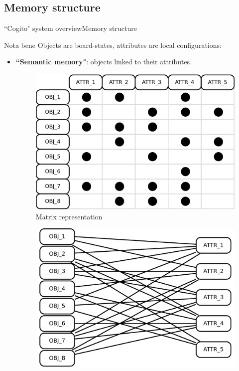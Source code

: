 \subsection{Memory structure}
\begin{frame}{``Cogito" system overview}{Memory structure}
\begin{block}{Nota bene}
Objects are board-states, attributes are local configurations:
\begin{itemize}
\item \textbf{``Semantic memory"}: objects linked to their attributes.
\begin{figure}[ht]
  \begin{minipage}[t]{0.45\linewidth}
    \vspace{0pt}
    \centering
    \includegraphics[width=\textwidth]{img/cogito/context_matrix}
    \\ Matrix representation
  \end{minipage}
  \hfill
  \begin{minipage}[t]{0.45\textwidth}
    \vspace{0pt}
    \centering
    \includegraphics[width=\textwidth]{img/cogito/context_graph}

\end{minipage}
\end{figure}
\end{itemize}
\end{block}
\end{frame}
